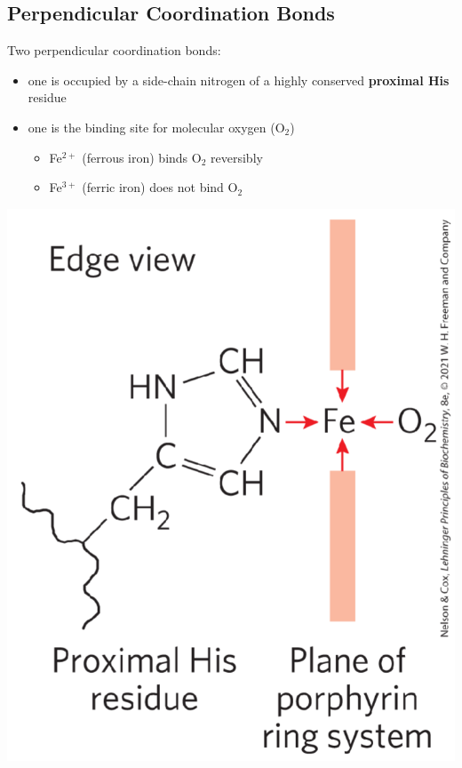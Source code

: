 \documentclass[10pt]{article}
\begin{document}
\subsection*{Perpendicular Coordination Bonds}
Two perpendicular coordination bonds:
\begin{itemize}
    \item one is occupied by a side-chain nitrogen of a highly conserved \textbf{proximal His} residue
    \item one is the binding site for molecular oxygen (O$_2$)
    \begin{itemize}
        \item Fe$^{2+}$ (ferrous iron) binds O$_2$ reversibly
        \item Fe$^{3+}$ (ferric iron) does not bind O$_2$
    \end{itemize}
\end{itemize}
\begin{center}
    \includegraphics*[scale=0.5]{L2_3.png}
\end{center}
\end{document}
